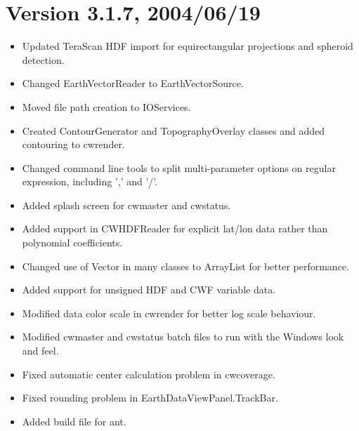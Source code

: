 

\section*{Version 3.1.7, 2004/06/19}

\begin{itemize}

  \item Updated TeraScan HDF import for equirectangular projections
  and spheroid detection.

  \item Changed EarthVectorReader to EarthVectorSource.

  \item Moved file path creation to IOServices.

  \item Created ContourGenerator and TopographyOverlay classes and
  added contouring to cwrender.

  \item Changed command line tools to split multi-parameter options on
  regular expression, including ',' and '/'.

  \item Added splash screen for cwmaster and cwstatus.

  \item Added support in CWHDFReader for explicit lat/lon data rather
  than polynomial coefficients.

  \item Changed use of Vector in many classes to ArrayList for better
  performance.

  \item Added support for unsigned HDF and CWF variable data.

  \item Modified data color scale in cwrender for better log scale
  behaviour.

  \item Modified cwmaster and cwstatus batch files to run with the
  Windows look and feel.

  \item Fixed automatic center calculation problem in cwcoverage.

  \item Fixed rounding problem in EarthDataViewPanel.TrackBar.

  \item Added build file for ant.


\end{itemize}
